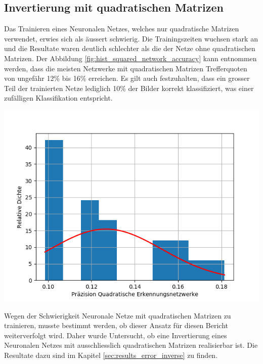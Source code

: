 \documentclass[Interploate_hadwritten_Digits.tex]{subfiles}
\begin{document}
	\subsection{Invertierung mit quadratischen Matrizen}
	Das Trainieren eines Neuronalen Netzes, welches nur quadratische Matrizen verwendet, erwies sich als äussert schwierig. Die Trainingszeiten wuchsen stark an und die Resultate waren deutlich schlechter als die der Netze ohne quadratischen Matrizen. Der Abbildung \ref{fig:hist_squared_network_accuracy} kann entnommen werden, dass die meisten Netzwerke mit quadratischen Matrizen Trefferquoten von ungefähr 12\% bis 16\% erreichen. Es gilt auch festzuhalten, dass ein grosser Teil der trainierten Netze lediglich 10\% der Bilder korrekt klassifiziert, was einer zufälligen Klassifikation entspricht.
	\begin{Figure}
		\centering
		\includegraphics[width=\linewidth]{img/results/histogram_squared_network_accuracy.png}
		\label{fig:hist_squared_network_accuracy}
	\end{Figure}

	Wegen der Schwierigkeit Neuronale Netze mit quadratischen Matrizen zu trainieren, musste bestimmt werden, ob dieser Ansatz für diesen Bericht weiterverfolgt wird. Daher wurde Untersucht, ob eine Invertierung eines Neuronalen Netzes mit ausschliesslich quadratischen Matrizen realisierbar ist.  Die Resultate dazu sind im Kapitel \ref{sec:results_error_inverse} zu finden.
	
\end{document}
